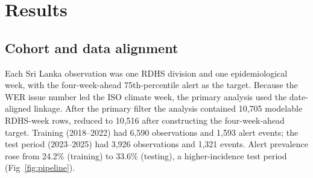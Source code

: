 \documentclass[11pt,a4paper]{article}
\begin{document}
\section{Results}

\subsection{Cohort and data alignment}
Each Sri Lanka observation was one RDHS division and one epidemiological week, with the four-week-ahead 75th-percentile alert as the target. Because the WER issue number led the ISO climate week, the primary analysis used the date-aligned linkage. After the primary filter the analysis contained 10{,}705 modelable RDHS-week rows, reduced to 10{,}516 after constructing the four-week-ahead target. Training (2018--2022) had 6{,}590 observations and 1{,}593 alert events; the test period (2023--2025) had 3{,}926 observations and 1{,}321 events. Alert prevalence rose from 24.2\% (training) to 33.6\% (testing), a higher-incidence test period (Fig~\ref{fig:pipeline}).
\end{document}
